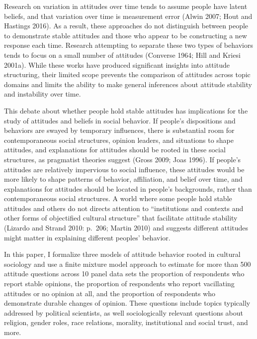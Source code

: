 \documentclass[12pt,]{article}
\begin{document}
Research on variation in attitudes over time tends to assume people have latent beliefs, and that variation over time is measurement error (Alwin 2007; Hout and Hastings 2016). As a result, these approaches do not distinguish between people to demonstrate stable attitudes and those who appear to be constructing a new response each time. Research attempting to separate these two types of behaviors tends to focus on a small number of attitudes (Converse 1964; Hill and Kriesi 2001a). While these works have produced significant insights into attitude structuring, their limited scope prevents the comparison of attitudes across topic domains and limits the ability to make general inferences about attitude stability and instability over time.

This debate about whether people hold stable attitudes has implications for the study of attitudes and beliefs in social behavior. If people's dispositions and behaviors are swayed by temporary influences, there is substantial room for contemporaneous social structures, opinion leaders, and situations to shape attitudes, and explanations for attitudes should be rooted in these social structures, as pragmatist theories suggest (Gross 2009; Joas 1996). If people's attitudes are relatively impervious to social influence, these attitudes would be more likely to shape patterns of behavior, affiliation, and belief over time, and explanations for attitudes should be located in people's backgrounds, rather than contemporaneous social structures. A world where some people hold stable attitudes and others do not directs attention to ``institutions and contexts and other forms of objectified cultural structure'' that facilitate attitude stability (Lizardo and Strand 2010: p.~206; Martin 2010) and suggests different attitudes might matter in explaining different peoples' behavior.

In this paper, I formalize three models of attitude behavior rooted in cultural sociology and use a finite mixture model approach to estimate for more than 500 attitude questions across 10 panel data sets the proportion of respondents who report stable opinions, the proportion of respondents who report vacillating attitudes or no opinion at all, and the proportion of respondents who demonstrate durable changes of opinion. These questions include topics typically addressed by political scientists, as well sociologically relevant questions about religion, gender roles, race relations, morality, institutional and social trust, and more.
\end{document}
